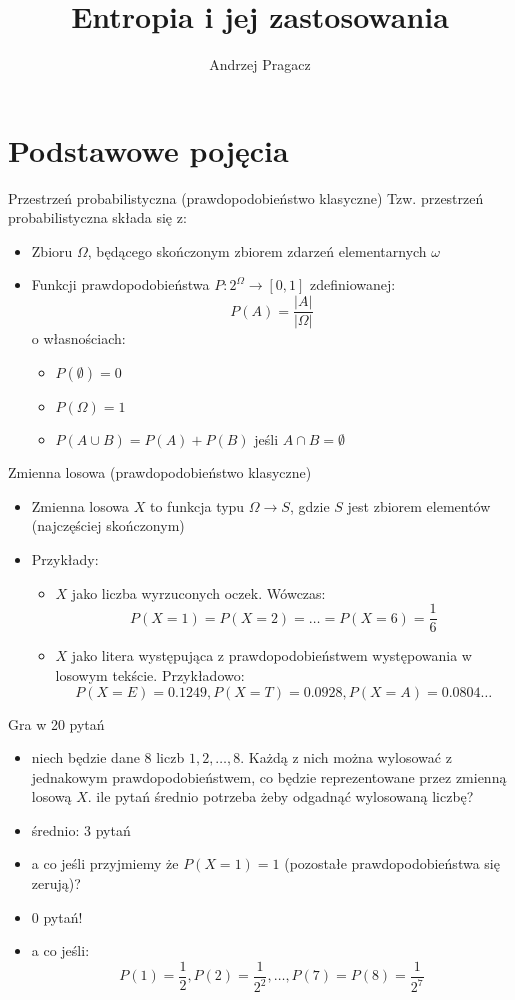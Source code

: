 \documentclass{beamer}
\title{Entropia i jej zastosowania}
\author{Andrzej Pragacz}
\begin{document}
\titlepage

\section{Podstawowe pojęcia}

\begin{frame}{Przestrzeń probabilistyczna (prawdopodobieństwo klasyczne)}
Tzw. przestrzeń probabilistyczna składa się z:
\begin{itemize}
  \item Zbioru $\Omega$, będącego skończonym zbiorem zdarzeń elementarnych $\omega$
  \item Funkcji prawdopodobieństwa $P: 2^\Omega \to [0, 1]$ zdefiniowanej:
  $$
  P(A) = \frac{|A|}{|\Omega|}
  $$
  o własnościach:
  \begin{itemize}
    \item $P(\emptyset) = 0$
    \item $P(\Omega) = 1$
    \item $P(A \cup B) = P(A) + P(B)$ jeśli $A \cap B = \emptyset$
  \end{itemize}
\end{itemize}
\end{frame}

\begin{frame}{Zmienna losowa (prawdopodobieństwo klasyczne)}
\begin{itemize}
  \item Zmienna losowa $X$ to funkcja typu $\Omega \to S$, gdzie $S$ jest
  zbiorem elementów (najczęściej skończonym)
  \item Przykłady:
  \begin{itemize}
    \item $X$ jako liczba wyrzuconych oczek. Wówczas: $$P(X=1) = P(X=2) = \ldots = P(X=6) = \frac{1}{6}$$
    \item $X$ jako litera występująca z prawdopodobieństwem występowania
    w losowym tekście. Przykładowo:
    $$ P(X=E) = 0.1249, P(X=T) = 0.0928, P(X=A) = 0.0804 \ldots$$
  \end{itemize}
\end{itemize}
\end{frame}

\begin{frame}{Gra w 20 pytań}
\begin{itemize}
  \item niech będzie dane 8 liczb $1, 2, \ldots, 8$. Każdą z nich można wylosować
  z jednakowym prawdopodobieństwem, co będzie reprezentowane
  przez zmienną losową $X$. ile pytań średnio potrzeba żeby odgadnąć
  wylosowaną liczbę?
  \pause
  \item średnio: 3 pytań
  \item a co jeśli przyjmiemy że $P(X=1) = 1$ (pozostałe prawdopodobieństwa się zerują)?
  \pause
  \item 0 pytań!
  \item a co jeśli:
  $$
  P(1) = \frac{1}{2}, P(2) = \frac{1}{2^2}, \ldots, P(7) = P(8) = \frac{1}{2^7}
  $$
\end{itemize}
\end{frame}
\end{document}
